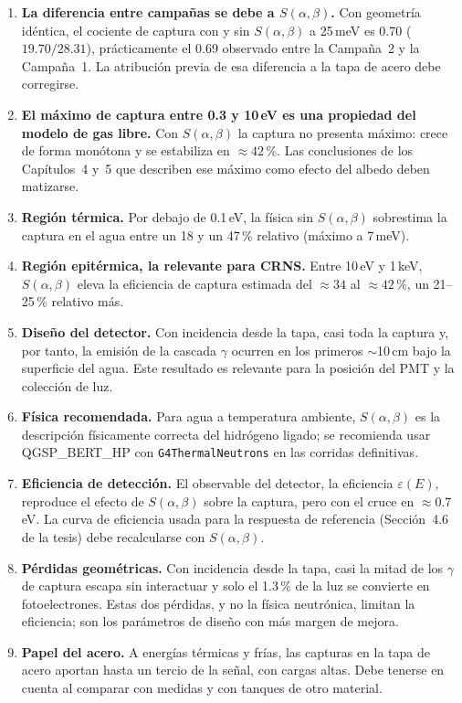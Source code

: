 \documentclass[11pt,a4paper]{article}
\newcommand{\var}[1]{\texttt{#1}}
\newcommand{\sab}{$S(\alpha,\beta)$}
\begin{document}
\begin{enumerate}
  \item \textbf{La diferencia entre campañas se debe a \sab{}.} Con geometría idéntica, el cociente de captura con y sin \sab{} a 25\,meV es 0.70 ($19.70/28.31$), prácticamente el 0.69 observado entre la Campaña~2 y la Campaña~1. La atribución previa de esa diferencia a la tapa de acero debe corregirse.
  \item \textbf{El máximo de captura entre 0.3 y 10\,eV es una propiedad del modelo de gas libre.} Con \sab{} la captura no presenta máximo: crece de forma monótona y se estabiliza en $\approx42$\,\%. Las conclusiones de los Capítulos~4 y~5 que describen ese máximo como efecto del albedo deben matizarse.
  \item \textbf{Región térmica.} Por debajo de 0.1\,eV, la física sin \sab{} sobrestima la captura en el agua entre un 18 y un 47\,\% relativo (máximo a 7\,meV).
  \item \textbf{Región epitérmica, la relevante para CRNS.} Entre 10\,eV y 1\,keV, \sab{} eleva la eficiencia de captura estimada del $\approx34$ al $\approx42$\,\%, un 21--25\,\% relativo más.
  \item \textbf{Diseño del detector.} Con incidencia desde la tapa, casi toda la captura y, por tanto, la emisión de la cascada $\gamma$ ocurren en los primeros $\sim$10\,cm bajo la superficie del agua. Este resultado es relevante para la posición del PMT y la colección de luz.
  \item \textbf{Física recomendada.} Para agua a temperatura ambiente, \sab{} es la descripción físicamente correcta del hidrógeno ligado; se recomienda usar QGSP\_BERT\_HP con \var{G4ThermalNeutrons} en las corridas definitivas.
  \item \textbf{Eficiencia de detección.} El observable del detector, la eficiencia $\varepsilon(E)$, reproduce el efecto de \sab{} sobre la captura, pero con el cruce en $\approx0.7$\,eV. La curva de eficiencia usada para la respuesta de referencia (Sección~4.6 de la tesis) debe recalcularse con \sab{}.
  \item \textbf{Pérdidas geométricas.} Con incidencia desde la tapa, casi la mitad de los $\gamma$ de captura escapa sin interactuar y solo el 1.3\,\% de la luz se convierte en fotoelectrones. Estas dos pérdidas, y no la física neutrónica, limitan la eficiencia; son los parámetros de diseño con más margen de mejora.
  \item \textbf{Papel del acero.} A energías térmicas y frías, las capturas en la tapa de acero aportan hasta un tercio de la señal, con cargas altas. Debe tenerse en cuenta al comparar con medidas y con tanques de otro material.
\end{enumerate}
\end{document}
